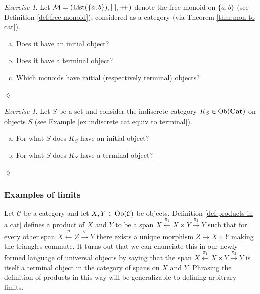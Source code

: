 \documentclass{book}
\def\tn{\textnormal}
\def\mc{\mathcal}
\def\List{\tn{List}}
\def\Ob{\tn{Ob}}
\def\to{\rightarrow}
\def\plpl{+\!\!+\hspace{1pt}}
\newcommand{\To}[1]{\xrightarrow{#1}}
\newcommand{\From}[1]{\xleftarrow{#1}}
\def\Cat{{\bf Cat}}
\def\mcC{\mc{C}}
\def\mcM{\mc{M}}
\theoremstyle{remark}
\newtheorem{exc}[subsubsection]{Exercise}
\newenvironment{exercise}{\begin{exc}}{\hspace*{\fill}$\lozenge$\end{exc}}
\theoremstyle{definition}
\def\sexc{\begin{enumerate}[a.)]\setlength{\itemsep}{.1cm}\setlength{\parskip}{.1cm}\item}
\def\next{\item}
\def\endsexc{\end{enumerate}}
\begin{document}
\begin{exercise}
Let $\mcM=(\List(\{a,b\}),[\;],\plpl)$ denote the free monoid on $\{a,b\}$ (see Definition \ref{def:free monoid}), considered as a category (via Theorem \ref{thm:mon to cat}).
\sexc Does it have an initial object?
\next Does it have a terminal object?
\next Which monoids have initial (respectively terminal) objects?
\endsexc
\end{exercise}

\begin{exercise}
Let $S$ be a set and consider the indiscrete category $K_S\in\Ob(\Cat)$ on objects $S$ (see Example \ref{ex:indiscrete cat equiv to terminal}).
\sexc For what $S$ does $K_S$ have an initial object?
\next For what $S$ does $K_S$ have a terminal object?
\endsexc
\end{exercise}


\subsubsection{Examples of limits}\label{sec:examples of limits}

Let $\mcC$ be a category and let $X,Y\in\Ob(\mcC)$ be objects. Definition \ref{def:products in a cat} defines a product  of $X$ and $Y$ to be a span $X\From{\pi_1}X\times Y\To{\pi_2}Y$ such that for every other span $X\From{p}Z\To{q}Y$ there exists a unique morphism $Z\to X\times Y$ making the triangles commute. It turns out that we can enunciate this in our newly formed language of universal objects by saying that the span $X\From{\pi_1}X\times Y\To{\pi_2}Y$ is itself a terminal object in the category of spans on $X$ and $Y$. Phrasing the definition of products in this way will be generalizable to defining arbitrary limits.
\end{document}
